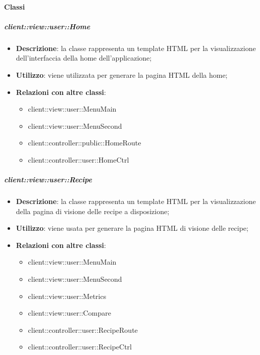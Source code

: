 	\paragraph{Classi} %
		\subparagraph{client::view::user::Home} %
		\label{subp:bdsm_app_client_view_user_home}
			\begin{itemize}
				\item \textbf{Descrizione}: la classe rappresenta un template HTML per la visualizzazione dell'interfaccia della home dell'applicazione;
				\item \textbf{Utilizzo}: viene utilizzata per generare la pagina HTML della home;
				\item \textbf{Relazioni con altre classi}:
					\begin{itemize}
						\item client::view::user::MenuMain
						\item client::view::user::MenuSecond
						\item client::controller::public::HomeRoute
						\item client::controller::user::HomeCtrl
					\end{itemize}
			\end{itemize}

		\subparagraph{client::view::user::Recipe} %
		\label{subp:bdsm_app_client_view_user_recipe}
			\begin{itemize}
				\item \textbf{Descrizione}: la classe rappresenta un template HTML per la visualizzazione della pagina di visione delle recipe a disposizione;
				\item \textbf{Utilizzo}: viene usata per generare la pagina HTML di visione delle recipe;
				\item \textbf{Relazioni con altre classi}:
					\begin{itemize}
						\item client::view::user::MenuMain
						\item client::view::user::MenuSecond
						\item client::view::user::Metrics
						\item client::view::user::Compare
						\item client::controller::user::RecipeRoute
						\item client::controller::user::RecipeCtrl
					\end{itemize}
			\end{itemize}

